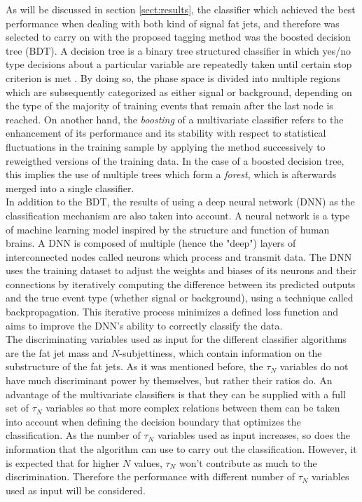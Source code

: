 \documentclass[main]{subfiles} %
\begin{document}
As will be discussed in section \ref{sect:results}, the classifier which achieved the best performance when dealing with both kind of signal fat jets, and therefore was selected to carry on with the proposed tagging method was the boosted decision tree (BDT). A decision tree is a binary tree structured classifier in which yes/no type decisions about a particular variable are repeatedly taken until certain stop criterion is met \cite{Quinlan1987}. By doing so, the phase space is divided into multiple regions which are subsequently categorized as either signal or background, depending on the type of the majority of training events that remain after the last node is reached. On another hand, the \textit{boosting} of a multivariate classifier refers to the enhancement of its performance and its stability with respect to statistical fluctuations in the training sample by applying the method successively to reweigthed versions of the training data. In the case of a boosted decision tree, this implies the use of multiple trees which form a \textit{forest}, which is afterwards merged into a single classifier. \\

In addition to the BDT, the results of using a deep neural network (DNN) as the classification mechanism are also taken into account. A neural network is a type of machine learning model inspired by the structure and function of human brains. A DNN is composed of multiple (hence the "deep") layers of interconnected nodes called neurons which process and transmit data. The DNN uses the training dataset to adjust the weights and biases of its neurons and their connections by iteratively computing the difference between its predicted outputs and the true event type (whether signal or background), using a technique called backpropagation. This iterative process minimizes a defined loss function and aims to improve the DNN's ability to correctly classify the data. \\

The discriminating variables used as input for the different classifier algorithms are the fat jet mass and $N$-subjettiness, which contain information on the substructure of the fat jets. As it was mentioned before, the $\tau_N$ variables do not have much discriminant power by themselves, but rather their ratios do. An advantage of the multivariate classifiers is that they can be supplied with a full set of $\tau_N$ variables so that more complex relations between them can be taken into account when defining the decision boundary that optimizes the classification. As the number of $\tau_N$ variables used as input increases, so does the information that the algorithm can use to carry out the classification. However, it is expected that for higher $N$ values, $\tau_N$ won't contribute as much to the discrimination. Therefore the performance with different number of $\tau_N$ variables used as input will be considered. \\
\end{document}
